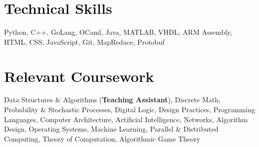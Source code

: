 \documentclass[letterpaper,10pt]{resume}
\newcommand{\resumeItem }[2]{
  \item\small{
    \textbf{#1}{: #2 \vspace{-4.5pt}}
  }
}
\newcommand{\resumeSubItem}[2]{\resumeItem{#1}{#2}\vspace{0pt}}
\newcommand{\resumeSubHeadingListEnd}{\end{itemize}}
\begin{document}
  

\vspace{-0.1cm}
\section{Technical Skills}
 {Python, C++, GoLang, OCaml, Java, MATLAB, VHDL, ARM Assembly, HTML, CSS, JavaScript, Git, MapReduce, Protobuf} %
 \vspace{-0.5cm}

\section{Relevant Coursework}
    {Data Structures \& Algorithms (\textbf{Teaching Assistant}), Discrete Math, Probability \& Stochastic Processes, Digital Logic, Design Practices, Programming Languages, Computer Architecture, Artificial Intelligence, Networks, Algorithm Design, Operating Systems, Machine Learning, Parallel \& Distributed Computing, Theory of Computation, Algorithmic Game Theory}

    
 
\end{document}
